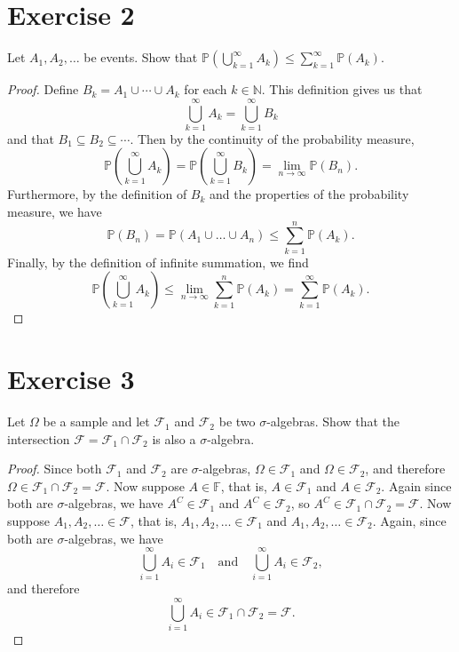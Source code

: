 \documentclass[12pt]{article}
\newenvironment{problem}
    {\begin{lrbox}{\mybox}\begin{minipage}{\textwidth-10pt}}
    {\end{minipage}\end{lrbox}\framebox[6.5in]{\usebox{\mybox}}}
\newcommand{\ds}{\displaystyle}
\newcommand{\isp}[1]{\quad\text{#1}\quad}
\newcommand{\N}{\mathbb{N}}
\newcommand{\F}{\mathbb{F}}
\newcommand{\FF}{\mathcal{F}}
\renewcommand{\P}{\mathbb{P}}
\begin{document}
\section*{Exercise 2}
\begin{problem}
    Let $A_1,A_2,\dots$ be events. Show that $\ds\P\left(\bigcup_{k=1}^\infty A_k\right) \leq \sum_{k=1}^\infty\P(A_k)$.
\end{problem}

\begin{proof}
    Define $B_k=A_1\cup\cdots\cup A_k$ for each $k\in\N$. This definition gives us that
    \[\bigcup_{k=1}^\infty A_k = \bigcup_{k=1}^\infty B_k\]
    and that $B_1\subseteq B_2\subseteq \cdots$. Then by the continuity of the probability measure,
    \[\P\left(\bigcup_{k=1}^\infty A_k\right) = \P\left(\bigcup_{k=1}^\infty B_k\right) = \lim_{n\to\infty}\P(B_n).\]
    Furthermore, by the definition of $B_k$ and the properties of the probability measure, we have
    \[\P(B_n) = \P(A_1\cup\dots\cup A_n) \leq \sum_{k=1}^n\P(A_k).\]
    Finally, by the definition of infinite summation, we find
    \[\P\left(\bigcup_{k=1}^\infty A_k\right) \leq \lim_{n\to\infty}\sum_{k=1}^n\P(A_k) = \sum_{k=1}^\infty\P(A_k).\]
    
\end{proof}

\newpage
\section*{Exercise 3}
\begin{problem}
    Let $\Omega$ be a sample and let $\FF_1$ and $\FF_2$ be two $\sigma$-algebras. Show that the intersection $\FF=\FF_1\cap\FF_2$ is also a $\sigma$-algebra.
\end{problem}

\begin{proof}
    Since both $\FF_1$ and $\FF_2$ are $\sigma$-algebras, $\Omega\in\FF_1$ and $\Omega\in\FF_2$, and therefore $\Omega\in\FF_1\cap\FF_2=\FF$. Now suppose $A\in\F$, that is, $A\in\FF_1$ and $A\in\FF_2$. Again since both are $\sigma$-algebras, we have $A^C\in\FF_1$ and $A^C\in\FF_2$, so $A^C\in\FF_1\cap\FF_2=\FF$. Now suppose $A_1,A_2,\dots\in\FF$, that is, $A_1,A_2,\dots\in\FF_1$ and $A_1,A_2,\dots\in\FF_2$. Again, since both are $\sigma$-algebras, we have
    \[\bigcup_{i=1}^\infty A_i \in \FF_1 \isp{and} \bigcup_{i=1}^\infty A_i \in \FF_2,\]
    and therefore
    \[\bigcup_{i=1}^\infty A_i \in \FF_1\cap\FF_2 = \FF.\]
    
\end{proof}
\end{document}
